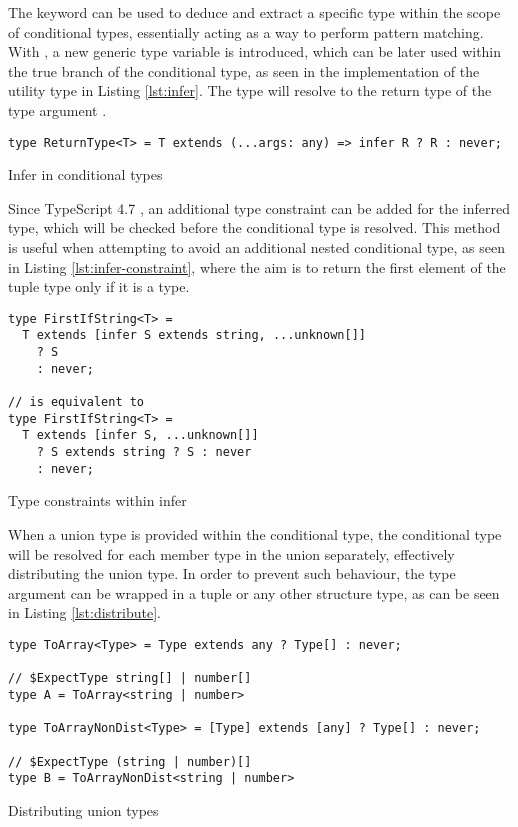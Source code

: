 The  keyword can be used to deduce and extract a specific type within the scope of conditional types, essentially acting as a way to perform pattern matching. With , a new generic type variable is introduced, which can be later used within the true branch of the conditional type, as seen in the implementation of the  utility type in Listing \ref{lst:infer}. The  type will resolve to the return type of the type argument .

\begin{listing}[ht]
  \begin{verbatim}
type ReturnType<T> = T extends (...args: any) => infer R ? R : never;
\end{verbatim}
  \caption{Infer in conditional types}\label{lst:infer}
\end{listing}

Since TypeScript 4.7 \cite{AnnouncingTypeScript4.7}, an additional type constraint can be added for the inferred type, which will be checked before the conditional type is resolved. This method is useful when attempting to avoid an additional nested conditional type, as seen in Listing \ref{lst:infer-constraint}, where the aim is to return the first element of the tuple type only if it is a  type.

\begin{listing}[ht]
  \begin{verbatim}
type FirstIfString<T> =
  T extends [infer S extends string, ...unknown[]]
    ? S
    : never;

// is equivalent to 
type FirstIfString<T> =
  T extends [infer S, ...unknown[]]
    ? S extends string ? S : never
    : never;
\end{verbatim}
  \caption{Type constraints within infer}\label{lst:infer-constraint}
\end{listing}

When a union type is provided within the conditional type, the conditional type will be resolved for each member type in the union separately, effectively distributing the union type. In order to prevent such behaviour, the type argument can be wrapped in a tuple or any other structure type, as can be seen in Listing \ref{lst:distribute}.

\begin{listing}[ht]
  \begin{verbatim}
type ToArray<Type> = Type extends any ? Type[] : never;

// $ExpectType string[] | number[]
type A = ToArray<string | number> 

type ToArrayNonDist<Type> = [Type] extends [any] ? Type[] : never;

// $ExpectType (string | number)[]
type B = ToArrayNonDist<string | number> 
\end{verbatim}
  \caption{Distributing union types}\label{lst:distribute}
\end{listing}

